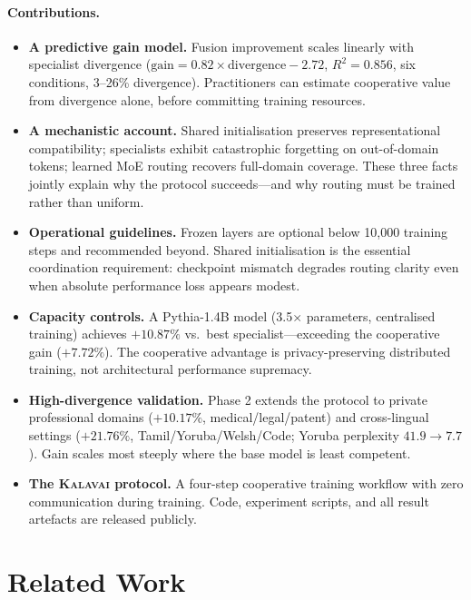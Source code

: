 \documentclass{article}
\newcommand{\kalavai}{\textsc{Kalavai}\xspace}
\begin{document}
\paragraph{Contributions.}
\begin{itemize}[leftmargin=*, itemsep=2pt]
  \item \textbf{A predictive gain model.} Fusion improvement scales linearly with specialist divergence ($\text{gain} = 0.82 \times \text{divergence} - 2.72$, $R^2 = 0.856$, six conditions, 3--26\% divergence). Practitioners can estimate cooperative value from divergence alone, before committing training resources.
  \item \textbf{A mechanistic account.} Shared initialisation preserves representational compatibility; specialists exhibit catastrophic forgetting on out-of-domain tokens; learned MoE routing recovers full-domain coverage. These three facts jointly explain why the protocol succeeds---and why routing must be trained rather than uniform.
  \item \textbf{Operational guidelines.} Frozen layers are optional below 10,000 training steps and recommended beyond. Shared initialisation is the essential coordination requirement: checkpoint mismatch degrades routing clarity even when absolute performance loss appears modest.
  \item \textbf{Capacity controls.} A Pythia-1.4B model (3.5$\times$ parameters, centralised training) achieves $+10.87\%$ vs.\ best specialist---exceeding the cooperative gain ($+7.72\%$). The cooperative advantage is privacy-preserving distributed training, not architectural performance supremacy.
  \item \textbf{High-divergence validation.} Phase 2 extends the protocol to private professional domains ($+10.17\%$, medical/legal/patent) and cross-lingual settings ($+21.76\%$, Tamil/Yoruba/Welsh/Code; Yoruba perplexity $41.9\to7.7$). Gain scales most steeply where the base model is least competent.
  \item \textbf{The \kalavai protocol.} A four-step cooperative training workflow with zero communication during training. Code, experiment scripts, and all result artefacts are released publicly.
\end{itemize}

\section{Related Work}
\label{sec:related}
\end{document}

